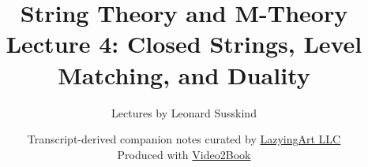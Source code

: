 \documentclass[11pt,oneside]{book}
\begin{document}
\hypersetup{pageanchor=false}
\frontmatter
\title{String Theory and M-Theory\\[0.45em]
\large Lecture 4: Closed Strings, Level Matching, and Duality}
\author{Lectures by Leonard Susskind}
\date{Transcript-derived companion notes curated by
\href{https://lazying.art}{LazyingArt LLC}\\[0.35em]
\small Produced with
\href{https://github.com/lachlanchen/Video2Book}{Video2Book}}
\maketitle
\hypersetup{pageanchor=true}
\mainmatter

\end{document}
